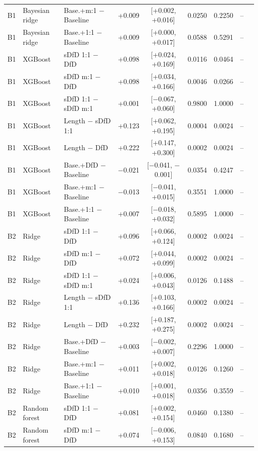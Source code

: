 \begin{longtable}{lllcccccc}
B1 & Bayesian ridge & Base.+m:1 $-$ Baseline & +0.009 & [+0.002, +0.016] & 0.0250 & 0.2250 & -- \\
B1 & Bayesian ridge & Base.+1:1 $-$ Baseline & +0.009 & [+0.000, +0.017] & 0.0588 & 0.5291 & -- \\
B1 & XGBoost & sDfD 1:1 $-$ DfD & +0.098 & [+0.024, +0.169] & 0.0116 & 0.0464 & -- \\
B1 & XGBoost & sDfD m:1 $-$ DfD & +0.098 & [+0.034, +0.166] & 0.0046 & 0.0266 & -- \\
B1 & XGBoost & sDfD 1:1 $-$ sDfD m:1 & +0.001 & [$-$0.067, +0.060] & 0.9800 & 1.0000 & -- \\
B1 & XGBoost & Length $-$ sDfD 1:1 & +0.123 & [+0.062, +0.195] & 0.0004 & 0.0024 & -- \\
B1 & XGBoost & Length $-$ DfD & +0.222 & [+0.147, +0.300] & 0.0002 & 0.0024 & -- \\
B1 & XGBoost & Base.+DfD $-$ Baseline & $-$0.021 & [$-$0.041, $-$0.001] & 0.0354 & 0.4247 & -- \\
B1 & XGBoost & Base.+m:1 $-$ Baseline & $-$0.013 & [$-$0.041, +0.015] & 0.3551 & 1.0000 & -- \\
B1 & XGBoost & Base.+1:1 $-$ Baseline & +0.007 & [$-$0.018, +0.032] & 0.5895 & 1.0000 & -- \\
B2 & Ridge & sDfD 1:1 $-$ DfD & +0.096 & [+0.066, +0.124] & 0.0002 & 0.0024 & -- \\
B2 & Ridge & sDfD m:1 $-$ DfD & +0.072 & [+0.044, +0.099] & 0.0002 & 0.0024 & -- \\
B2 & Ridge & sDfD 1:1 $-$ sDfD m:1 & +0.024 & [+0.006, +0.043] & 0.0126 & 0.1488 & -- \\
B2 & Ridge & Length $-$ sDfD 1:1 & +0.136 & [+0.103, +0.166] & 0.0002 & 0.0024 & -- \\
B2 & Ridge & Length $-$ DfD & +0.232 & [+0.187, +0.275] & 0.0002 & 0.0024 & -- \\
B2 & Ridge & Base.+DfD $-$ Baseline & +0.003 & [$-$0.002, +0.007] & 0.2296 & 1.0000 & -- \\
B2 & Ridge & Base.+m:1 $-$ Baseline & +0.011 & [+0.002, +0.018] & 0.0126 & 0.1260 & -- \\
B2 & Ridge & Base.+1:1 $-$ Baseline & +0.010 & [+0.001, +0.018] & 0.0356 & 0.3559 & -- \\
B2 & Random forest & sDfD 1:1 $-$ DfD & +0.081 & [+0.002, +0.154] & 0.0460 & 0.1380 & -- \\
B2 & Random forest & sDfD m:1 $-$ DfD & +0.074 & [$-$0.006, +0.153] & 0.0840 & 0.1680 & -- \\

\end{longtable}
